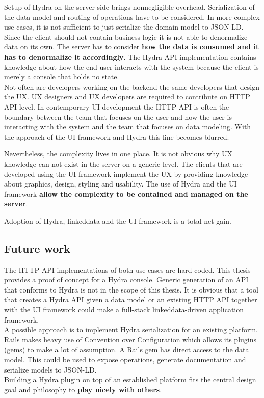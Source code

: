 Setup of Hydra on the server side brings nonnegligible overhead. Serialization of the data model and routing of operations have to be considered. In more complex use cases, it is not sufficient to just serialize the domain model to JSON-LD. Since the client should not contain business logic it is not able to denormalize data on its own. The server has to consider \textbf{how the data is consumed and it has to denormalize it accordingly}. The Hydra API implementation contains knowledge about how the end user interacts with the system because the client is merely a console that holds no state. \\
Not often are developers working on the backend the same developers that design the UX. UX designers and UX developers are required to contribute on HTTP API level. In contemporary UI development the HTTP API is often the boundary between the team that focuses on the user and how the user is interacting with the system and the team that focuses on data modeling. With the approach of the UI framework and Hydra this line becomes blurred.

Nevertheless, the complexity lives in one place. It is not obvious why UX knowledge can not exist in the server on a generic level. The clients that are developed using the UI framework implement the UX by providing knowledge about graphics, design, styling and usability. The use of Hydra and the UI framework \textbf{allow the complexity to be contained and managed on the server}.

Adoption of Hydra, \gls{linkeddata} and the UI framework is a total net gain.

\subsection{Future work}
The HTTP API implementations of both use cases are hard coded. This thesis provides a proof of concept for a Hydra console. Generic generation of an API that conforms to Hydra is not in the scope of this thesis. It is obvious that a tool that creates a Hydra API given a data model or an existing HTTP API together with the UI framework could make a full-stack \gls{linkeddata}-driven application framework. \\
A possible approach is to implement Hydra serialization for an existing platform. Rails makes heavy use of Convention over Configuration which allows its plugins (gems) to make a lot of assumption. A Rails gem has direct access to the data model. This could be used to expose operations, generate documentation and serialize models to JSON-LD. \\
Building a Hydra plugin on top of an established platform fits the central design goal and philosophy to \textbf{play nicely with others}.
